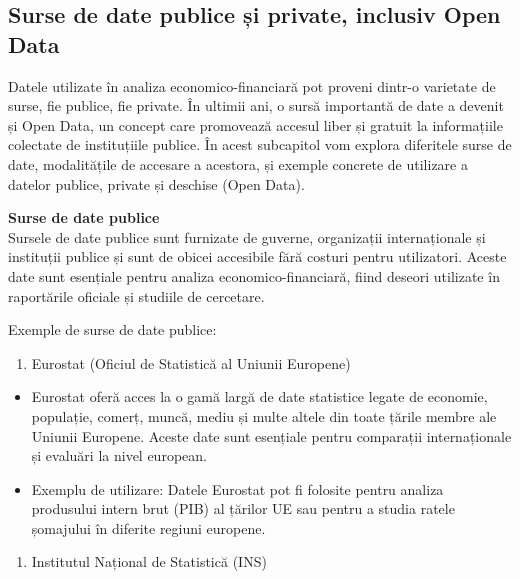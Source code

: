\documentclass[
  11pt,
  b5paper,
  nottoc]{book}
\providecommand{\tightlist}{%
  \setlength{\itemsep}{0pt}\setlength{\parskip}{0pt}}\usepackage{longtable,booktabs,array}
\begin{document}
\hypertarget{surse-de-date-publice-ux219i-private-inclusiv-open-data}{%
\subsection{Surse de date publice și private, inclusiv Open
Data}\label{surse-de-date-publice-ux219i-private-inclusiv-open-data}}

Datele utilizate în analiza economico-financiară pot proveni dintr-o
varietate de surse, fie publice, fie private. În ultimii ani, o sursă
importantă de date a devenit și Open Data, un concept care promovează
accesul liber și gratuit la informațiile colectate de instituțiile
publice. În acest subcapitol vom explora diferitele surse de date,
modalitățile de accesare a acestora, și exemple concrete de utilizare a
datelor publice, private și deschise (Open Data).

\textbf{Surse de date publice}\\
Sursele de date publice sunt furnizate de guverne, organizații
internaționale și instituții publice și sunt de obicei accesibile fără
costuri pentru utilizatori. Aceste date sunt esențiale pentru analiza
economico-financiară, fiind deseori utilizate în raportările oficiale și
studiile de cercetare.

Exemple de surse de date publice:

\begin{enumerate}
\def\labelenumi{\arabic{enumi}.}
\tightlist
\item
  Eurostat (Oficiul de Statistică al Uniunii Europene)\\
\end{enumerate}

\begin{itemize}
\tightlist
\item
  Eurostat oferă acces la o gamă largă de date statistice legate de
  economie, populație, comerț, muncă, mediu și multe altele din toate
  țările membre ale Uniunii Europene. Aceste date sunt esențiale pentru
  comparații internaționale și evaluări la nivel european.\\
\item
  Exemplu de utilizare: Datele Eurostat pot fi folosite pentru analiza
  produsului intern brut (PIB) al țărilor UE sau pentru a studia ratele
  șomajului în diferite regiuni europene.
\end{itemize}

\begin{enumerate}
\def\labelenumi{\arabic{enumi}.}
\setcounter{enumi}{1}
\tightlist
\item
  Institutul Național de Statistică (INS)\\
\end{enumerate}
\end{document}
